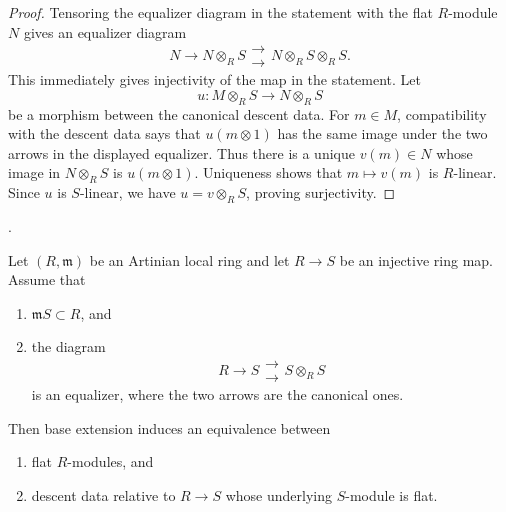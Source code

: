 \begin{proof}
Tensoring the equalizer diagram in the statement with the flat $R$-module
$N$ gives an equalizer diagram
$$
N \longrightarrow N \otimes_R S
\mathrel{\substack{\longrightarrow \\[-0.6ex] \longrightarrow}}
N \otimes_R S \otimes_R S.
$$
This immediately gives injectivity of the map in the statement. Let
$$
u : M \otimes_R S \longrightarrow N \otimes_R S
$$
be a morphism between the canonical descent data. For $m \in M$, compatibility
with the descent data says that $u(m \otimes 1)$ has the same image under the
two arrows in the displayed equalizer. Thus there is a unique $v(m) \in N$
whose image in $N \otimes_R S$ is $u(m \otimes 1)$. Uniqueness shows that
$m \mapsto v(m)$ is $R$-linear. Since $u$ is $S$-linear, we have
$u = v \otimes_R S$, proving surjectivity.
\end{proof}

\begin{lemma}
\label{lemma-artinian-small-effective-descent-flat-modules}
\begin{reference}
\cite[Expos\'e 195, B, Th\'eor\`eme 2, p. 378]{FGA}.
\end{reference}
Let $(R, \mathfrak m)$ be an Artinian local ring and let
$R \to S$ be an injective ring map. Assume that
\begin{enumerate}
\item $\mathfrak mS \subset R$, and
\item the diagram
$$
R \longrightarrow S
\mathrel{\substack{\longrightarrow \\[-0.6ex] \longrightarrow}}
S \otimes_R S
$$
is an equalizer, where the two arrows are the canonical ones.
\end{enumerate}
Then base extension induces an equivalence between
\begin{enumerate}
\item flat $R$-modules, and
\item descent data relative to $R \to S$ whose underlying $S$-module is flat.
\end{enumerate}
\end{lemma}

